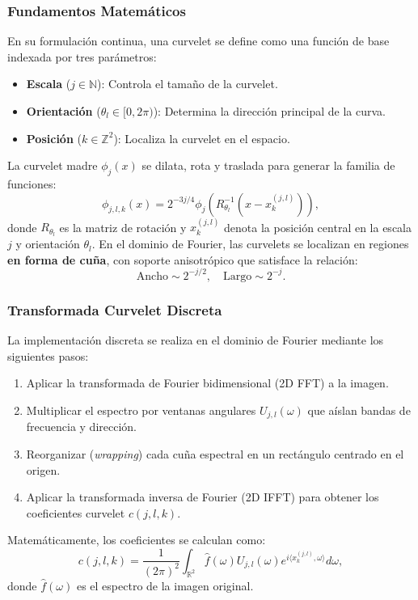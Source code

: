 \subsubsection{Fundamentos Matemáticos}

En su formulación continua, una curvelet se define como una función de base indexada por tres parámetros: 
\begin{itemize}
    \item \textbf{Escala} (\(j \in \mathbb{N}\)): Controla el tamaño de la curvelet.
    \item \textbf{Orientación} (\(\theta_l \in [0, 2\pi)\)): Determina la dirección principal de la curva.
    \item \textbf{Posición} (\(k \in \mathbb{Z}^2\)): Localiza la curvelet en el espacio.
\end{itemize}

La curvelet madre \(\phi_j(x)\) se dilata, rota y traslada para generar la familia de funciones:
\[
\phi_{j,l,k}(x) = 2^{-3j/4} \phi_j \left( R_{\theta_l}^{-1}(x - x_k^{(j,l)}) \right),
\]
donde \(R_{\theta_l}\) es la matriz de rotación y \(x_k^{(j,l)}\) denota la posición central en la escala \(j\) y orientación \(\theta_l\). En el dominio de Fourier, las curvelets se localizan en regiones \textbf{en forma de cuña}, con soporte anisotrópico que satisface la relación:
\[
\text{Ancho} \sim 2^{-j/2}, \quad \text{Largo} \sim 2^{-j}.
\]

\subsubsection{Transformada Curvelet Discreta}

La implementación discreta se realiza en el dominio de Fourier mediante los siguientes pasos\cite{FastCurveletTransform}:
\begin{enumerate}
    \item Aplicar la transformada de Fourier bidimensional (2D FFT) a la imagen.
    \item Multiplicar el espectro por ventanas angulares \(U_{j,l}(\omega)\) que aíslan bandas de frecuencia y dirección.
    \item Reorganizar (\emph{wrapping}) cada cuña espectral en un rectángulo centrado en el origen.
    \item Aplicar la transformada inversa de Fourier (2D IFFT) para obtener los coeficientes curvelet \(c(j,l,k)\).
\end{enumerate}

Matemáticamente, los coeficientes se calculan como:
\[
c(j,l,k) = \frac{1}{(2\pi)^2} \int_{\mathbb{R}^2} \hat{f}(\omega) U_{j,l}(\omega) e^{i\langle x_k^{(j,l)}, \omega \rangle} d\omega,
\]
donde \(\hat{f}(\omega)\) es el espectro de la imagen original.

